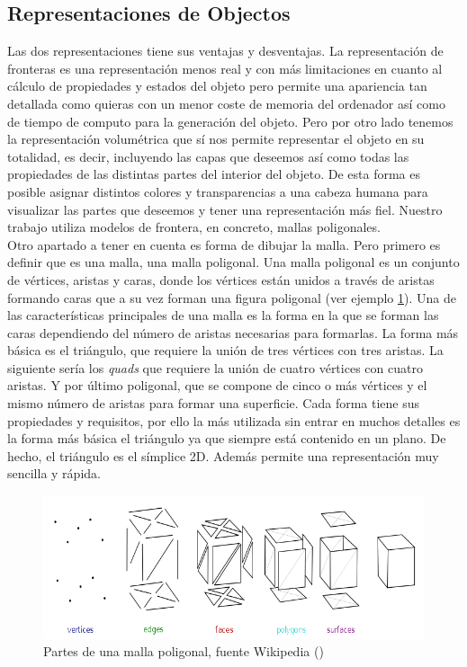 \subsection{ Representaciones de Objectos}
Las dos representaciones tiene sus ventajas y desventajas. La representación de fronteras 
es una representación menos real y con más limitaciones en cuanto al cálculo de propiedades y estados del objeto pero permite una apariencia tan detallada como quieras con un menor coste de memoria del ordenador así como de tiempo de computo para la generación del objeto. Pero por otro lado tenemos la representación volumétrica que sí nos permite representar el objeto en su totalidad, es decir, incluyendo las capas que deseemos así como todas las propiedades de las distintas partes del interior del objeto. De esta forma es posible asignar distintos colores y transparencias a una cabeza humana para visualizar las partes que deseemos y tener una representación más fiel. Nuestro trabajo utiliza modelos de frontera, en concreto, mallas poligonales.\\

Otro apartado a tener en cuenta es forma de dibujar la malla. Pero primero es definir que es una malla, una malla poligonal. Una malla poligonal es un conjunto de vértices, aristas y caras, donde los vértices están unidos a través de aristas formando caras que a su vez forman una figura poligonal (ver ejemplo \ref{fig:mesh_overview.png}). Una de las características principales de una malla es la forma en la que se forman las caras dependiendo del número de aristas necesarias para formarlas. La forma más básica es el triángulo, que requiere la unión de tres vértices con tres aristas. La siguiente sería los \textit{quads} que requiere la unión de cuatro vértices con cuatro aristas. Y por último poligonal, que se compone de cinco o más vértices y el mismo número de aristas para formar una superficie. Cada forma tiene sus propiedades y requisitos, por ello la más utilizada sin entrar en muchos detalles es la forma más básica el triángulo ya que siempre está contenido en un plano. De hecho, el triángulo es el símplice 2D. Además permite una representación muy sencilla y rápida.\\

\begin{figure} %
\centering
\includegraphics[scale=0.4]{imagenes/Mesh_overview.png} 
\caption{Partes de una malla poligonal, fuente Wikipedia (\cite{lobsterbakeEnglishLicensingCcbysa32009})} \label{fig:mesh_overview.png}
\end{figure}

